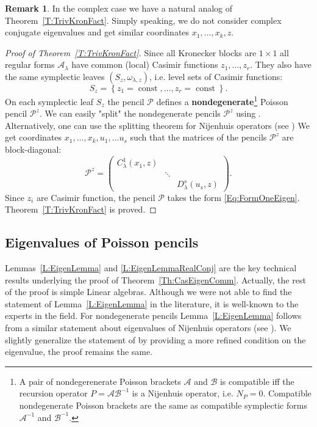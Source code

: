 \documentclass[12pt]{article}
\theoremstyle{definition}
\newtheorem{remark}[lemma]{Remark}
\begin{document}
\begin{remark}
In the complex case we have a natural analog of  Theorem~\ref{T:TrivKronFact}. Simply speaking, we do not consider complex conjugate eigenvalues and get similar coordinates $x_1, \dots, x_k, z$.  \end{remark}

\begin{proof}[Proof of Theorem~\ref{T:TrivKronFact}] Since all Kronecker blocks are $1 \times 1$ all  regular forms $\mathcal{A}_{\lambda}$ have common (local) Casimir functions $z_1, \dots, z_r$. They also have the same symplectic leaves $(S_z, \omega_{\lambda, z})$, i.e. level sets of Casimir functions: \[ S_z = \left\{ z_1 = \operatorname{const}, \dots, z_r = \operatorname{const}\right\}. \] On each symplectic leaf $S_z$ the pencil $\mathcal{P}$ defines a  \textbf{nondegenerate}\footnote{A pair of nondegerenerate Poisson brackets $\mathcal{A}$ and $\mathcal{B}$ is compatible iff the recursion operator $P =\mathcal{A}\mathcal{B}^{-1}$ is a Nijenhuis operator, i.e. $N_{P} = 0$. Compatible nondegenerate Poisson brackets are the same as compatible symplectic forms $\mathcal{A}^{-1}$ and $\mathcal{B}^{-1}$.} Poisson pencil $\mathcal{P}^z$. We can easily "split" the nondegenerate pencils $\mathcal{P}^z$ using \cite[Lemma 2]{turiel}. Alternatively, one can use  the splitting theorem for Nijenhuis operators (see \cite[Theorem 3.1]{BolsinovNijenhuis}) We get coordinates $x_1, \dots, x_k, u_1, \dots u_s$ such that the matrices of the pencils $\mathcal{P}^z$ are block-diagonal: \[ \mathcal{P}^z =  \left( \begin{matrix} C^1_{\lambda}(x_1, z) & &  \\ & \ddots &  \\ & & D^s_{\lambda}(u_s, z) \end{matrix} \right). \] Since $z_i$ are Casimir function, the pencil $\mathcal{P}$ takes the form \eqref{Eq:FormOneEigen}. Theorem~\ref{T:TrivKronFact} is proved. \end{proof}



\subsection{Eigenvalues of Poisson pencils}

Lemmas~\ref{L:EigenLemma} and \ref{L:EigenLemmaRealConj} are the key technical results underlying the proof of Theorem~\ref{Th:CasEigenComm}. Actually, the rest of the proof is simple Linear algebras.  Although we were not able to find the statement of Lemma~\ref{L:EigenLemma} in
the literature, it is well-known to the experts in the field. For nondegenerate pencils
Lemma~\ref{L:EigenLemma} follows from a similar statement about eigenvalues of Nijenhuis operators
(see \cite[Proposition 2.3]{BolsinovNijenhuis}). We slightly generalize the statement of \cite[Lemma 9.8]{Kozlov23JKRealization} by providing a more refined condition on the eigenvalue,  the proof remains the same.  
\end{document}
